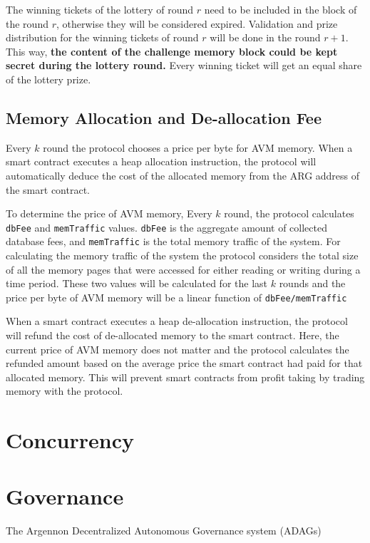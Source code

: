 The winning tickets of the lottery of round $r$ need to be included in the block of the round $r$,
otherwise they will be considered expired. Validation and prize distribution for the winning tickets of round
$r$ will be done in the round $r + 1$. This way, \textbf{the content of the challenge memory block could be
kept secret during the lottery round.} Every winning ticket will get an equal share of the lottery prize.

\subsection{Memory Allocation and De-allocation Fee}\label{subsec:memory-allocation-and-de-allocation}

Every $k$ round the protocol chooses a price per byte for AVM memory. When a smart contract executes a heap
allocation instruction, the protocol will automatically deduce the cost of the allocated memory from the ARG
address of the smart contract.

To determine the price of AVM memory, Every $k$ round, the protocol calculates \texttt{dbFee} and
\texttt{memTraffic} values. \texttt{dbFee} is the aggregate amount of collected database fees, and
\texttt{memTraffic} is the total memory traffic of the system. For calculating the memory traffic of the system
the protocol considers the total size of all the memory pages that were accessed for either reading or writing
during a time period. These two values will be calculated for the last $k$ rounds and the price per byte of
AVM memory will be a linear function of \texttt{dbFee/memTraffic}

When a smart contract executes a heap de-allocation instruction, the protocol will refund the cost of
de-allocated memory to the smart contract. Here, the current price of AVM memory does not matter and the protocol
calculates the refunded amount based on the average price the smart contract had paid for that allocated memory.
This will prevent smart contracts from profit taking by trading memory with the protocol.


\section{Concurrency}\label{sec:concurrency}



\section{Governance}\label{sec:governance}
The Argennon Decentralized Autonomous Governance system (ADAGs)

